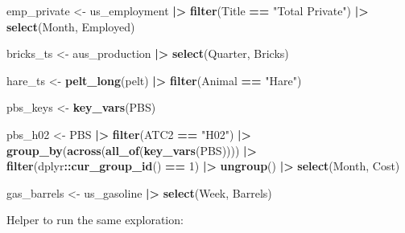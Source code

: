 \documentclass[
  11pt,
]{article}
\newenvironment{Shaded}{\begin{snugshade}}{\end{snugshade}}
\newcommand{\DecValTok}[1]{\textcolor[rgb]{0.00,0.00,0.81}{#1}}
\newcommand{\FunctionTok}[1]{\textcolor[rgb]{0.13,0.29,0.53}{\textbf{#1}}}
\newcommand{\NormalTok}[1]{#1}
\newcommand{\OtherTok}[1]{\textcolor[rgb]{0.56,0.35,0.01}{#1}}
\newcommand{\SpecialCharTok}[1]{\textcolor[rgb]{0.81,0.36,0.00}{\textbf{#1}}}
\newcommand{\StringTok}[1]{\textcolor[rgb]{0.31,0.60,0.02}{#1}}
\begin{document}
\begin{Shaded}
\begin{Highlighting}[]
\NormalTok{emp\_private }\OtherTok{\textless{}{-}}\NormalTok{ us\_employment }\SpecialCharTok{|\textgreater{}}
  \FunctionTok{filter}\NormalTok{(Title }\SpecialCharTok{==} \StringTok{"Total Private"}\NormalTok{) }\SpecialCharTok{|\textgreater{}}
  \FunctionTok{select}\NormalTok{(Month, Employed)}

\NormalTok{bricks\_ts }\OtherTok{\textless{}{-}}\NormalTok{ aus\_production }\SpecialCharTok{|\textgreater{}} \FunctionTok{select}\NormalTok{(Quarter, Bricks)}

\NormalTok{hare\_ts }\OtherTok{\textless{}{-}} \FunctionTok{pelt\_long}\NormalTok{(pelt) }\SpecialCharTok{|\textgreater{}} \FunctionTok{filter}\NormalTok{(Animal }\SpecialCharTok{==} \StringTok{"Hare"}\NormalTok{)}

\NormalTok{pbs\_keys }\OtherTok{\textless{}{-}} \FunctionTok{key\_vars}\NormalTok{(PBS)}

\NormalTok{pbs\_h02 }\OtherTok{\textless{}{-}}\NormalTok{ PBS }\SpecialCharTok{|\textgreater{}}
  \FunctionTok{filter}\NormalTok{(ATC2 }\SpecialCharTok{==} \StringTok{"H02"}\NormalTok{) }\SpecialCharTok{|\textgreater{}}
  \FunctionTok{group\_by}\NormalTok{(}\FunctionTok{across}\NormalTok{(}\FunctionTok{all\_of}\NormalTok{(}\FunctionTok{key\_vars}\NormalTok{(PBS)))) }\SpecialCharTok{|\textgreater{}}
  \FunctionTok{filter}\NormalTok{(dplyr}\SpecialCharTok{::}\FunctionTok{cur\_group\_id}\NormalTok{() }\SpecialCharTok{==} \DecValTok{1}\NormalTok{) }\SpecialCharTok{|\textgreater{}}
  \FunctionTok{ungroup}\NormalTok{() }\SpecialCharTok{|\textgreater{}}
  \FunctionTok{select}\NormalTok{(Month, Cost)}

\NormalTok{gas\_barrels }\OtherTok{\textless{}{-}}\NormalTok{ us\_gasoline }\SpecialCharTok{|\textgreater{}} \FunctionTok{select}\NormalTok{(Week, Barrels)}
\end{Highlighting}
\end{Shaded}

Helper to run the same exploration:
\end{document}
